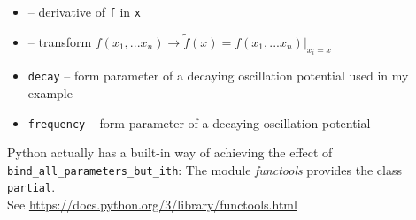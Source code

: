 
\begin{frame}[fragile]
%
\begin{defbox}
\begin{itemize}
\item {} -- derivative of \texttt{f} in \texttt{x}
\item {} -- transform $f(x_1, ... x_n) \to \tilde{f}(x) = f(x_1, ... x_n) |_{x_i = x}$
\end{itemize}
\end{defbox}
%
\begin{defbox}
\begin{itemize}
\item \texttt{decay} -- form parameter of a decaying oscillation potential used in my example
\item \texttt{frequency} -- form parameter of a decaying oscillation potential
\end{itemize}
\end{defbox}
%
\begin{hintbox}
\small
Python actually has a built-in way of achieving the effect of \texttt{bind\_all\_parameters\_but\_ith}: The module \emph{functools} provides the class \texttt{partial}.\\
See \url{https://docs.python.org/3/library/functools.html}
\end{hintbox}
%
\end{frame}



